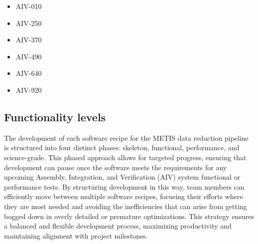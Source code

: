 \documentclass[a4paper]{spie}  %
\begin{document}
\begin{itemize}
    \item AIV-010
    \item AIV-250
    \item AIV-370
    \item AIV-490
    \item AIV-640
    \item AIV-920
\end{itemize}



\subsection{Functionality levels}
\label{ssec:dev_levels}

The development of each software recipe for the METIS data reduction pipeline is structured into four distinct phases: skeleton, functional, performance, and science-grade. This phased approach allows for targeted progress, ensuring that development can pause once the software meets the requirements for any upcoming Assembly, Integration, and Verification (AIV) system functional or performance tests. By structuring development in this way, team members can efficiently move between multiple software recipes, focusing their efforts where they are most needed and avoiding the inefficiencies that can arise from getting bogged down in overly detailed or premature optimizations. This strategy ensures a balanced and flexible development process, maximizing productivity and maintaining alignment with project milestones. 
  
\end{document}
